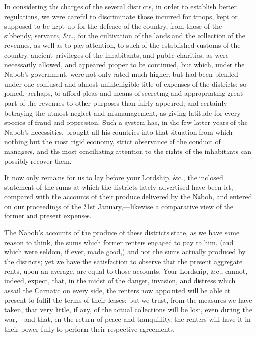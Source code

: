 In considering the charges of the several districts, in order to establish better regulations, we were careful to discriminate those incurred for troops, kept or supposed to be kept up for the defence of the country, from those of the sibbendy, servants, \&c., for the cultivation of the lands and the collection of the revenues, as well as to pay attention, to such of the established customs of the country, ancient privileges of the inhabitants, and public charities, as were necessarily allowed, and appeared proper to be continued, but which, under the Nabob's government, were not only rated much higher, but had been blended under one confused and almost unintelligible title of expenses of the districts: so joined, perhaps, to afford pleas and means of secreting and appropriating great part of the revenues to other purposes than fairly appeared; and certainly betraying the utmost neglect and mismanagement, as giving latitude for every species of fraud and oppression. Such a system has, in the few latter years of the Nabob's necessities, brought all his countries into that situation from which nothing but the most rigid economy, strict observance of the conduct of managers, and the most conciliating attention to the rights of the inhabitants can possibly recover them.

It now only remains for us to lay before your Lordship, \&c., the inclosed statement of the sums at which the districts lately advertised have been let, compared with the accounts of their produce delivered by the Nabob, and entered on our proceedings of the 21st January,—likewise a comparative view of the former and present expenses.

The Nabob's accounts of the produce of these districts state, as we have some reason to think, the sums which former renters engaged to pay to him, (and which were seldom, if ever, made good,) and not the sums actually produced by the districts; yet we have the satisfaction to observe that the present aggregate rents, upon an average, are equal to those accounts. Your Lordship, \&c., cannot, indeed, expect, that, in the midst of the danger, invasion, and distress which assail the Carnatic on every side, the renters now appointed will be able at present to fulfil the terms of their leases; but we trust, from the measures we have taken, that very little, if any, of the actual collections will be lost, even during the war,—and that, on the return of peace and tranquillity, the renters will have it in their power fully to perform their respective agreements.

